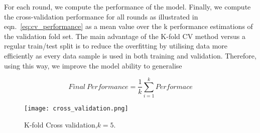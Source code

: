 For each round, we compute the performance of the model.
Finally, we compute the cross-validation performance for all rounds as illustrated in eqn.~\ref{eq:cv_performance} as a mean value over the k performance estimations of the validation fold set.
The main advantage of the K-fold CV method versus a regular train/test split is to reduce the overfitting by utilising data more efficiently as every data sample is used in both training and validation. 
Therefore, using this way, we improve the model ability to generalise

\begin{equation}
Final \ Performance = \frac{1}{k}\sum_{i=1}^{k}Performace
\label{eq:cv_performance}
\end{equation}
\begin{figure}
	\centering
	\texttt{[image: cross\_validation.png]}
	\caption{K-fold Cross validation,\(k=5\).}
	\label{fig:Cross_validation}
\end{figure}
